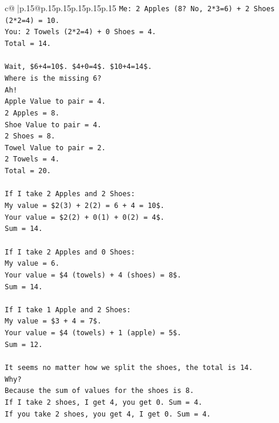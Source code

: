 \documentclass{article}
\begin{document}
{\begin{supertabular}{c@{$\;$}|p{.15\linewidth}@{}p{.15\linewidth}p{.15\linewidth}p{.15\linewidth}p{.15\linewidth}p{.15\linewidth}}
{{{\texttt{Me: 2 Apples (8? No, 2*3=6) + 2 Shoes (2*2=4) = 10.} \\
\texttt{You: 2 Towels (2*2=4) + 0 Shoes = 4.} \\
\texttt{Total = 14.} \\
\\ 
\texttt{Wait, \$6+4=10\$. \$4+0=4\$. \$10+4=14\$.} \\
\texttt{Where is the missing 6?} \\
\texttt{Ah!} \\
\texttt{Apple Value to pair = 4.} \\
\texttt{2 Apples = 8.} \\
\texttt{Shoe Value to pair = 4.} \\
\texttt{2 Shoes = 8.} \\
\texttt{Towel Value to pair = 2.} \\
\texttt{2 Towels = 4.} \\
\texttt{Total = 20.} \\
\\ 
\texttt{If I take 2 Apples and 2 Shoes:} \\
\texttt{My value = \$2(3) + 2(2) = 6 + 4 = 10\$.} \\
\texttt{Your value = \$2(2) + 0(1) + 0(2) = 4\$.} \\
\texttt{Sum = 14.} \\
\\ 
\texttt{If I take 2 Apples and 0 Shoes:} \\
\texttt{My value = 6.} \\
\texttt{Your value = \$4 (towels) + 4 (shoes) = 8\$.} \\
\texttt{Sum = 14.} \\
\\ 
\texttt{If I take 1 Apple and 2 Shoes:} \\
\texttt{My value = \$3 + 4 = 7\$.} \\
\texttt{Your value = \$4 (towels) + 1 (apple) = 5\$.} \\
\texttt{Sum = 12.} \\
\\ 
\texttt{It seems no matter how we split the shoes, the total is 14.} \\
\texttt{Why?} \\
\texttt{Because the sum of values for the shoes is 8.} \\
\texttt{If I take 2 shoes, I get 4, you get 0. Sum = 4.} \\
\texttt{If you take 2 shoes, you get 4, I get 0. Sum = 4.} \\
}}}
\end{supertabular}}
\end{document}
